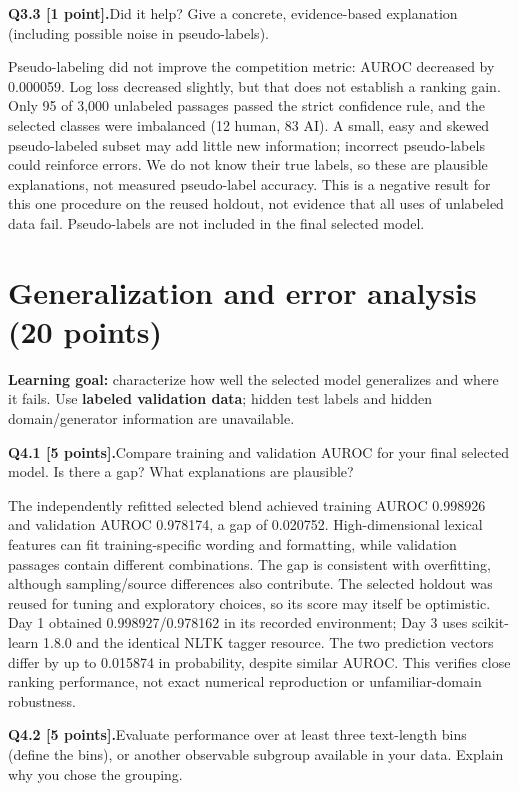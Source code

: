 \documentclass[11pt,letterpaper]{article}
\newcommand{\question}[2]{\needspace{4\baselineskip}\par\addvspace{0.45em}\noindent\textbf{#1}\quad #2\par\nobreak\vspace{0.1em}}
\begin{document}
\question{Q3.3 [1 point].}{Did it help? Give a concrete, evidence-based explanation (including possible noise in pseudo-labels).}

Pseudo-labeling did not improve the competition metric: AUROC decreased by 0.000059. Log loss decreased slightly, but that does not establish a ranking gain. Only 95 of 3,000 unlabeled passages passed the strict confidence rule, and the selected classes were imbalanced (12 human, 83 AI). A small, easy and skewed pseudo-labeled subset may add little new information; incorrect pseudo-labels could reinforce errors. We do not know their true labels, so these are plausible explanations, not measured pseudo-label accuracy. This is a negative result for this one procedure on the reused holdout, not evidence that all uses of unlabeled data fail. Pseudo-labels are not included in the final selected model.

\newpage
\section{Generalization and error analysis (20 points)}
\textbf{Learning goal:} characterize how well the selected model generalizes and where it fails. Use \textbf{labeled validation data}; hidden test labels and hidden domain/generator information are unavailable.

\question{Q4.1 [5 points].}{Compare training and validation AUROC for your final selected model. Is there a gap? What explanations are plausible?}

The independently refitted selected blend achieved training AUROC 0.998926 and validation AUROC 0.978174, a gap of 0.020752. High-dimensional lexical features can fit training-specific wording and formatting, while validation passages contain different combinations. The gap is consistent with overfitting, although sampling/source differences also contribute. The selected holdout was reused for tuning and exploratory choices, so its score may itself be optimistic. Day 1 obtained 0.998927/0.978162 in its recorded environment; Day 3 uses scikit-learn 1.8.0 and the identical NLTK tagger resource. The two prediction vectors differ by up to 0.015874 in probability, despite similar AUROC. This verifies close ranking performance, not exact numerical reproduction or unfamiliar-domain robustness.

\question{Q4.2 [5 points].}{Evaluate performance over at least three text-length bins (define the bins), or another observable subgroup available in your data. Explain why you chose the grouping.}
\end{document}
